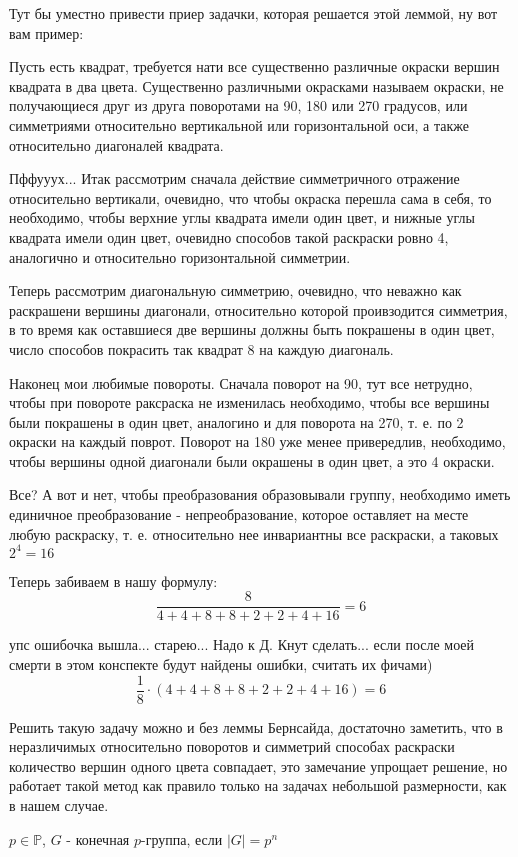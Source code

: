 Тут бы уместно привести приер задачки, которая решается этой леммой, ну вот вам пример:

Пусть есть квадрат, требуется нати все существенно различные окраски вершин квадрата в два цвета. Существенно различными окрасками называем окраски, не получающиеся друг из друга поворотами на 90, 180 или 270 градусов, или симметриями относительно вертикальной или горизонтальной оси, а также относительно диагоналей квадрата.

Пффууух... Итак рассмотрим сначала действие симметричного отражение относительно вертикали, очевидно, что чтобы окраска перешла сама в себя, то необходимо, чтобы верхние углы квадрата имели один цвет, и нижные углы квадрата имели один цвет, очевидно способов такой раскраски ровно 4, аналогично и относительно горизонтальной симметрии.

Теперь рассмотрим диагональную симметрию, очевидно, что неважно как раскрашени вершины диагонали, относительно которой проивзодится симметрия, в то время как оставшиеся две вершины должны быть покрашены в один цвет, число способов покрасить так квадрат 8 на каждую диагональ.

Наконец мои любимые повороты. Сначала поворот на 90, тут все нетрудно, чтобы при повороте раксраска не изменилась необходимо, чтобы все вершины были покрашены в один цвет, аналогино и для поворота на 270, т. е. по 2 окраски на каждый поврот. Поворот на 180 уже менее привередлив, необходимо, чтобы вершины одной диагонали были окрашены в один цвет, а это 4 окраски.

Все? А вот и нет, чтобы преобразования образовывали группу, необходимо иметь единичное преобразование - непреобразование, которое оставляет на месте любую раскраску, т. е. относительно нее инвариантны все раскраски, а таковых $2^4 = 16$

Теперь забиваем в нашу формулу:
\[
	\frac{8}{4 + 4 + 8 + 8 + 2 + 2 + 4 + 16} = 6
\]

упс ошибочка вышла... старею... Надо к Д. Кнут сделать... если после моей смерти в этом конспекте будут найдены ошибки, считать их фичами)
\[
	\frac{1}{8} \cdot \left(4+4+8+8+2+2+4+16\right) = 6
\]

Решить такую задачу можно и без леммы Бернсайда, достаточно заметить, что в неразличимых относительно поворотов и симметрий способах раскраски количество вершин одного цвета совпадает, это замечание упрощает решение, но работает такой метод как правило только на задачах небольшой размерности, как в нашем случае.

\begin{Def}
$p \in \mathbb{P}$, $G$ - конечная $p$-группа, если $\left|G\right| = p^n$
\end{Def}

